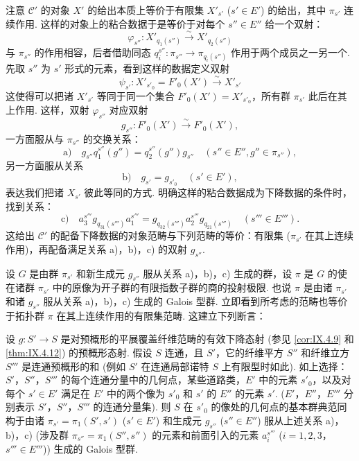注意 $\mathcal{C}'$ 的对象 $X'$ 的给出本质上等价于有限集 $X'_{s'}$ ($s' \in E'$) 的给出，其中 $\pi_{s'}$ 连续作用. 这样的对象上的粘合数据于是等价于对每个 $s'' \in E''$ 给一个双射：
\[
\varphi_{s''} \colon X'_{q_1(s'')} \xrightarrow{\sim} X'_{q_2(s'')}
\]
与 $\pi_{s''}$ 的作用相容，后者借助同态 $q_i^{s''} \colon \pi_{s''} \to \pi_{q_i(s'')}$ 作用于两个成员之一另一个. 先取 $s''$ 为 $s'$ 形式的元素，看到这样的数据定义双射
\[
\psi_{s'} \colon X'_{s'_0} = F'_0(X') \xrightarrow{\sim} X'_{s'}
\]
这使得可以把诸 $X'_{s'}$ 等同于同一个集合 $F'_0(X') = X'_{s'_0}$，所有群 $\pi_{s'}$ 此后在其上作用. 这样，双射 $\varphi_{s''}$ 对应双射
\[
g_{s''} \colon F'_0(X') \xrightarrow{\sim} F'_0(X'),
\]
一方面服从与 $\pi_{s''}$ 的交换关系：
\[
\mathrm{a)} \quad g_{s''} q_1^{s''}(g'') = q_2^{s''}(g'') g_{s''} \quad (s'' \in E'', g'' \in \pi_{s''}),
\]
另一方面服从关系
\[
\mathrm{b)} \quad g_{s'} = g_{s'_0} \quad (s' \in E'),
\]
表达我们把诸 $X_{s'}$ 彼此等同的方式. 明确这样的粘合数据成为下降数据的条件时，找到关系：
\[
\mathrm{c)} \quad a_3^{s'''} g_{q_{31}(s''')} a_1^{s'''} = g_{q_{32}(s''')} a_2^{s'''} g_{q_{21}(s''')} \quad (s''' \in E''').
\]
这给出 $\mathcal{C}'$ 的配备下降数据的对象范畴与下列范畴的等价：有限集 ($\pi_{s'}$ 在其上连续作用)，再配备满足关系 a)，b)，c) 的双射 $g_{s''}$.

设 $G$ 是由群 $\pi_{s'}$ 和新生成元 $g_{s''}$ 服从关系 a)，b)，c) 生成的群，设 $\pi$ 是 $G$ 的使在诸群 $\pi_{s'}$ 中的原像为开子群的有限指数子群的商的投射极限. 也说 $\pi$ 是由诸 $\pi_{s'}$ 和诸 $g_{s''}$ 服从关系 a)，b)，c) 生成的 Galois 型群. 立即看到所考虑的范畴也等价于拓扑群 $\pi$ 在其上连续作用的有限集范畴. 这建立下列断言：

\begin{theorem}\label{thm:IX.5.1}
设 $g \colon S' \to S$ 是对预概形的平展覆盖纤维范畴的有效下降态射 (参见 \ref{cor:IX.4.9} 和 \ref{thm:IX.4.12}) 的预概形态射. 假设 $S$ 连通，且 $S'$，它的纤维平方 $S''$ 和纤维立方 $S'''$ 是连通预概形的和 (例如 $S'$ 在连通局部诺特 $S$ 上有限型时如此). 如上选择：$S'$，$S''$，$S'''$ 的每个连通分量中的几何点，某些道路类，$E'$ 中的元素 $s'_0$，以及对每个 $s' \in E'$ 满足在 $E'$ 中的两个像为 $s'_0$ 和 $s'$ 的 $E''$ 的元素 $s'$. ($E'$，$E''$，$E'''$ 分别表示 $S'$，$S''$，$S'''$ 的连通分量集). 则 $S$ 在 $s'_0$ 的像处的几何点的基本群典范同构于由诸 $\pi_{s'} = \pi_1(S', s')$ ($s' \in E'$) 和生成元 $g_{s''}$ ($s'' \in E''$) 服从上述关系 a)，b)，c) (涉及群 $\pi_{s''} = \pi_1(S'', s'')$ 的元素和前面引入的元素 $a_i^{s'''}$ ($i = 1, 2, 3$，$s''' \in E'''$)) 生成的 Galois 型群.
\end{theorem}

